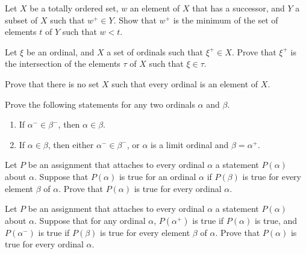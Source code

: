 \documentclass{article}
\begin{document}
\begin{exercise}
  \label{exe:ylp1zcc8}
  Let \(X\) be a totally ordered set, \(w\) an element of \(X\) that
  has a successor, and \(Y\) a subset of \(X\) such that
  \(w^+ \in Y\).  Show that \(w^+\) is the minimum of the set of
  elements \(t\) of \(Y\) such that \(w < t\).
\end{exercise}

\begin{exercise}
  \label{exe:ddc4bdfk}
  Let \(\xi\) be an ordinal, and \(X\) a set of ordinals such that
  \(\xi^+ \in X\).  Prove that \(\xi^+\) is the intersection of the
  elements \(\tau\) of \(X\) such that \(\xi \in \tau\).
\end{exercise}

\begin{exercise}
  \label{exe:9pk4eh7k}
  Prove that there is no set \(X\) such that every ordinal is an
  element of \(X\).
\end{exercise}

\begin{exercise}
  \label{exe:7tvca54w}
  Prove the following statements for any two ordinals \(\alpha\) and
  \(\beta\).
  \begin{enumerate}
  \item If \(\alpha^- \in \beta^-\), then \(\alpha \in \beta\).
  \item If \(\alpha \in \beta\), then either \(\alpha^- \in \beta^-\),
    or \(\alpha\) is a limit ordinal and \(\beta = \alpha^+\).
  \end{enumerate}
\end{exercise}

\begin{exercise}
  \label{exe:jxzsy88l}
  Let \(P\) be an assignment that attaches to every ordinal \(\alpha\)
  a statement \(P(\alpha)\) about \(\alpha\).  Suppose that
  \(P(\alpha)\) is true for an ordinal \(\alpha\) if \(P(\beta)\) is
  true for every element \(\beta\) of \(\alpha\).  Prove that
  \(P(\alpha)\) is true for every ordinal \(\alpha\).
\end{exercise}

\begin{exercise}
  \label{exe:h8nv276e}
  Let \(P\) be an assignment that attaches to every ordinal \(\alpha\)
  a statement \(P(\alpha)\) about \(\alpha\).  Suppose that for any
  ordinal \(\alpha\), \(P(\alpha^+)\) is true if \(P(\alpha)\) is
  true, and \(P(\alpha^-)\) is true if \(P(\beta)\) is true for every
  element \(\beta\) of \(\alpha\).  Prove that \(P(\alpha)\) is true
  for every ordinal \(\alpha\).
\end{exercise}
\end{document}
